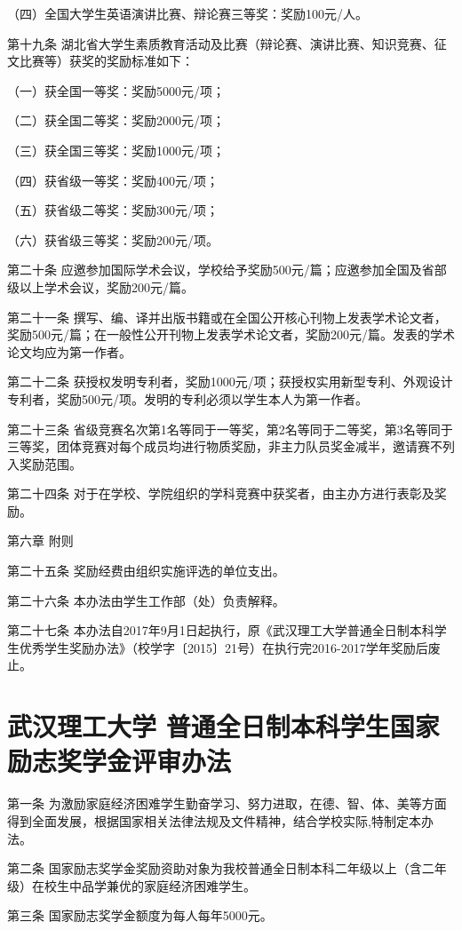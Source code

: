 \documentclass[UTF8,12pt,a4paper]{report}
\begin{document}
（四）全国大学生英语演讲比赛、辩论赛三等奖：奖励100元/人。

第十九条  湖北省大学生素质教育活动及比赛（辩论赛、演讲比赛、知识竞赛、征文比赛等）获奖的奖励标准如下：

（一）获全国一等奖：奖励5000元/项；

（二）获全国二等奖：奖励2000元/项；

（三）获全国三等奖：奖励1000元/项；

（四）获省级一等奖：奖励400元/项；

（五）获省级二等奖：奖励300元/项；

（六）获省级三等奖：奖励200元/项。

第二十条  应邀参加国际学术会议，学校给予奖励500元/篇；应邀参加全国及省部级以上学术会议，奖励200元/篇。

第二十一条  撰写、编、译并出版书籍或在全国公开核心刊物上发表学术论文者，奖励500元/篇；在一般性公开刊物上发表学术论文者，奖励200元/篇。发表的学术论文均应为第一作者。

第二十二条  获授权发明专利者，奖励1000元/项；获授权实用新型专利、外观设计专利者，奖励500元/项。发明的专利必须以学生本人为第一作者。

第二十三条  省级竞赛名次第1名等同于一等奖，第2名等同于二等奖，第3名等同于三等奖，团体竞赛对每个成员均进行物质奖励，非主力队员奖金减半，邀请赛不列入奖励范围。

第二十四条  对于在学校、学院组织的学科竞赛中获奖者，由主办方进行表彰及奖励。



第六章  附则

第二十五条  奖励经费由组织实施评选的单位支出。

第二十六条  本办法由学生工作部（处）负责解释。

第二十七条  本办法自2017年9月1日起执行，原《武汉理工大学普通全日制本科学生优秀学生奖励办法》（校学字〔2015〕21号）在执行完2016-2017学年奖励后废止。
\chapter{武汉理工大学 普通全日制本科学生国家励志奖学金评审办法}
第一条 为激励家庭经济困难学生勤奋学习、努力进取，在德、智、体、美等方面得到全面发展，根据国家相关法律法规及文件精神，结合学校实际,特制定本办法。

第二条 国家励志奖学金奖励资助对象为我校普通全日制本科二年级以上（含二年级）在校生中品学兼优的家庭经济困难学生。

第三条 国家励志奖学金额度为每人每年5000元。
\end{document}
